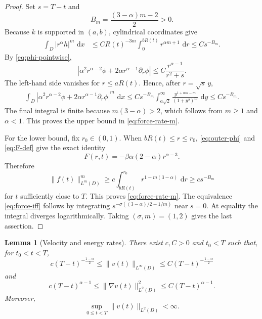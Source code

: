 \documentclass[10pt]{amsart}
\newtheorem{lemma}[theorem]{Lemma}
\theoremstyle{definition}
\newcommand{\dd}{\,\mathrm d}
\begin{document}
\begin{proof}
Set $s=T-t$ and
\[
    B_m=\frac{(3-\alpha)m-2}{2}>0.
\]
Because $k$ is supported in $(a,b)$, cylindrical coordinates give
\begin{align}
\label{eq:h-upper}
    \int_D|r^\alpha h|^m\,\dd x
    &\leq C R(t)^{-3m}
       \int_0^{bR(t)}r^{\alpha m+1}\,\dd r
      \leq Cs^{-B_m}.
\end{align}
By \eqref{eq:phi-pointwise},
\[
    \left|
      \alpha^2r^{\alpha-2}\phi
      +2\alpha r^{\alpha-1}\partial_r\phi
    \right|
    \leq C\frac{r^{\alpha-1}}{r^2+s}.
\]
The left-hand side vanishes for $r\leq aR(t)$.  Hence, after
$r=\sqrt{s}\,y$,
\begin{align}
\label{eq:remainder-upper}
\int_D
       \left|
         \alpha^2r^{\alpha-2}\phi
         +2\alpha r^{\alpha-1}\partial_r\phi
       \right|^m\,\dd x\leq
       Cs^{-B_m}
       \int_{a\sqrt2}^{\infty}
       \frac{y^{1+\alpha m-m}}{(1+y^2)^m}\,\dd y
       \leq Cs^{-B_m}.
\end{align}
The final integral is finite because $m(3-\alpha)>2$, which follows from
$m\geq1$ and $\alpha<1$.  This proves the upper bound in
\eqref{eq:force-rate-m}.

For the lower bound, fix $r_0\in(0,1)$.  When $bR(t)\leq r\leq r_0$,
\eqref{eq:outer-phi} and \eqref{eq:F-def} give the exact identity
\begin{equation}
\label{eq:F-outer}
    F(r,t)=-\beta\alpha(2-\alpha)r^{\alpha-3}.
\end{equation}
Therefore
\[
    \|f(t)\|_{L^m(D)}^m
    \geq c\int_{bR(t)}^{r_0}r^{1-m(3-\alpha)}\,\dd r
    \geq cs^{-B_m}
\]
for $t$ sufficiently close to $T$.  This proves \eqref{eq:force-rate-m}.
The equivalence \eqref{eq:force-iff} follows by integrating
$s^{-\sigma((3-\alpha)/2-1/m)}$ near $s=0$.  At equality the integral diverges
logarithmically.  Taking $(\sigma,m)=(1,2)$ gives the last assertion.
\end{proof}

\begin{lemma}[Velocity and energy rates]
\label{lem:velocity-rates}
There exist $c,C>0$ and $t_0<T$ such that, for $t_0<t<T$,
\begin{equation}
\label{eq:velocity-rate}
    c(T-t)^{-\frac{1-\alpha}{2}}
    \leq\|v(t)\|_{L^\infty(D)}
    \leq C(T-t)^{-\frac{1-\alpha}{2}}
\end{equation}
and
\begin{equation}
\label{eq:gradient-rate}
    c(T-t)^{\alpha-1}
    \leq\|\nabla v(t)\|_{L^2(D)}^2
    \leq C(T-t)^{\alpha-1}.
\end{equation}
Moreover,
\begin{equation}
\label{eq:L2-uniform}
    \sup_{0\leq t<T}\|v(t)\|_{L^2(D)}<\infty.
\end{equation}
\end{lemma}
\end{document}
